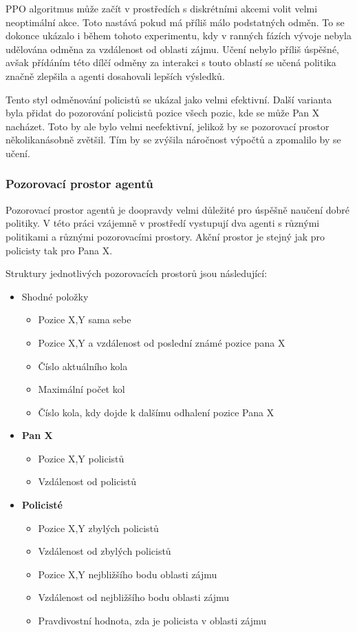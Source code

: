 PPO algoritmus může začít v prostředích s diskrétními akcemi volit velmi neoptimální akce.
Toto nastává pokud má příliš málo podstatných odměn\cite{PPO_weakness}.
To se dokonce ukázalo i během tohoto experimentu, kdy v ranných fázích vývoje nebyla udělována odměna za vzdálenost od oblasti zájmu.
Učení nebylo příliš úspěšné, avšak přídáním této dílčí odměny za interakci s touto oblastí se učená politika značně zlepšila a agenti dosahovali lepších výsledků.

Tento styl odměnování policistů se ukázal jako velmi efektivní.
Další varianta byla přidat do pozorování policistů pozice všech pozic, kde se může Pan X nacházet.
Toto by ale bylo velmi neefektivní, jelikož by se pozorovací prostor několikanásobně zvětšil.
Tím by se zvýšila náročnost výpočtů a zpomalilo by se učení.

\subsubsection*{Pozorovací prostor agentů}

Pozorovací prostor agentů je doopravdy velmi důležité pro úspěšně naučení dobré politiky.
V této práci vzájemně v prostředí vystupují dva agenti s různými politikami a různými pozorovacími prostory.
Akční prostor je stejný jak pro policisty tak pro Pana X\@.

Struktury jednotlivých pozorovacích prostorů jsou následující:

\begin{itemize}
  \item Shodné položky
    \begin{itemize}
    \item Pozice X,Y sama sebe
    \item Pozice X,Y a vzdálenost od poslední známé pozice pana X
    \item Číslo aktuálního kola
    \item Maximální počet kol
    \item Číslo kola, kdy dojde k dalšímu odhalení pozice Pana X
  \end{itemize}
  \item \textbf{Pan X}
    \begin{itemize}
    \item Pozice X,Y policistů
    \item Vzdálenost od  policistů
  \end{itemize}
  \item \textbf{Policisté}
    \begin{itemize}
    \item Pozice X,Y zbylých policistů
    \item Vzdálenost od zbylých policistů
    \item Pozice X,Y nejbližšího bodu oblasti zájmu
    \item Vzdálenost od nejbližšího bodu oblasti zájmu
    \item Pravdivostní hodnota, zda je policista v oblasti zájmu
  \end{itemize}
\end{itemize}

